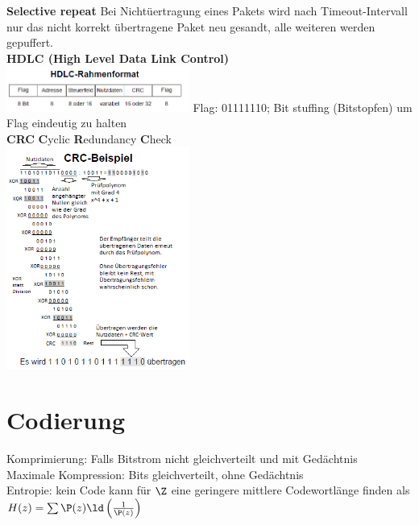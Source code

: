 \documentclass[fs, footer]{latex4ei}
\begin{document}
\begin{multicols*}{4}
{\textbf{Selective repeat}
	Bei Nichtüertragung eines Pakets wird nach Timeout-Intervall nur das nicht korrekt übertragene Paket neu gesandt, alle weiteren werden gepuffert. \\
	
\textbf{HDLC (High Level Data Link Control)} \\

	\includegraphics[width = 6cm]{./img/HDLC_Rahmen.png}
	 Flag: 01111110; Bit stuffing (Bitstopfen) um Flag eindeutig zu halten\\

\textbf{CRC} \textbf{C}yclic \textbf{R}edundancy \textbf{C}heck\\

\includegraphics[width = 6cm]{./img/CRC_Bsp.png}
}



\section{Codierung}
	Komprimierung: Falls Bitstrom nicht gleichverteilt und mit Gedächtnis\\
	Maximale Kompression: Bits gleichverteilt, ohne Gedächtnis\\
	Entropie: kein Code kann für $\Z$ eine geringere mittlere Codewortlänge finden als $H(z) = \sum \P(z) \ld\left(\frac{1}{\P(z)}\right)$\\

\sectionbox{
}
\end{multicols*}
\end{document}
